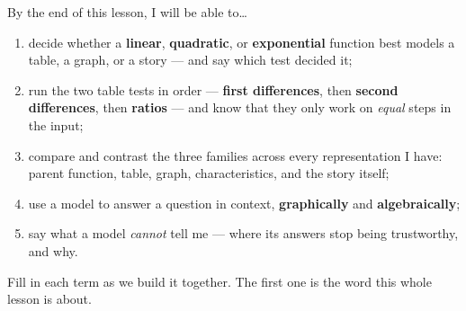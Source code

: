 \documentclass[10pt]{article}
\begin{document}

\vspace{0.15in}

\begin{objectivebox}
\small
By the end of this lesson, I will be able to\dots
\begin{enumerate}[leftmargin=1.5em, itemsep=2pt, topsep=3pt]
  \item decide whether a \textbf{linear}, \textbf{quadratic}, or \textbf{exponential} function best
        models a table, a graph, or a story --- and say which test decided it;
  \item run the two table tests in order --- \textbf{first differences}, then \textbf{second
        differences}, then \textbf{ratios} --- and know that they only work on \emph{equal} steps in
        the input;
  \item compare and contrast the three families across every representation I have: parent function,
        table, graph, characteristics, and the story itself;
  \item use a model to answer a question in context, \textbf{graphically} and \textbf{algebraically};
  \item say what a model \emph{cannot} tell me --- where its answers stop being trustworthy, and why.
\end{enumerate}
\end{objectivebox}

\vspace{0.10in}

\boxguard
\begin{vocabbox}
\small
Fill in each term as we build it together. The first one is the word this whole lesson is about.
\end{vocabbox}

\vspace{0.10in}
\end{document}
